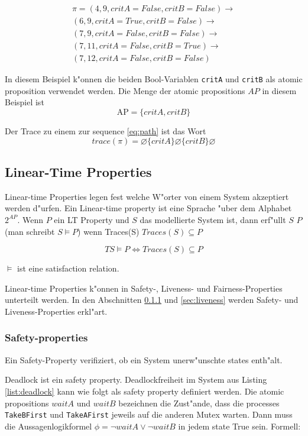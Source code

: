 \documentclass[a4paper, twoside]{article}
\begin{document}
\begin{equation}
  \label{eq:path}
  \begin{split}
\pi = (4, 9, {critA}={False},{critB}=False) \rightarrow \\
(6, 9, {critA}={True},{critB}=False) \rightarrow \\
(7, 9, {critA}={False},{critB}=False) \rightarrow \\
(7, 11, {critA}={False},{critB}=True) \rightarrow \\
(7, 12, {critA}={False},{critB}=False)
  \end{split}
\end{equation}

In diesem Beispiel k"onnen die beiden Bool-Variablen \verb|critA| und \verb|critB| als atomic proposition verwendet werden. Die Menge der atomic propositions $AP$ in diesem Beispiel ist
\[
\text{AP}=\{critA, critB\}
\]

Der Trace zu einem zur sequence \ref{eq:path} ist das Wort
\[
trace(\pi) = \varnothing \{critA\} \varnothing \{critB\} \varnothing
\]

\subsection{Linear-Time Properties}
\label{sec:satisfactionrelations}

Linear-time Properties legen fest welche W"orter von einem System akzeptiert werden d"urfen. Ein Linear-time property ist eine Sprache "uber dem Alphabet $2^{AP}$.
Wenn $P$ ein LT Property und $S$ das modellierte System ist, dann erf"ullt $S$ $P$ (man schreibt $S \models P$) wenn Traces(S) $ Traces(S) \subseteq P $

\[
TS \models P \iff Traces(S) \subseteq P 
\]

$ \models $ ist eine satisfaction relation. 

Linear-time Properties k"onnen in Safety-, Liveness- und Fairness-Properties unterteilt werden. In den Abschnitten \ref{sec:safety} und \ref{sec:liveness} werden Safety- und Liveness-Properties erkl"art.

\subsubsection{Safety-properties}
\label{sec:safety}

Ein Safety-Property verifiziert, ob ein System unerw"unschte states enth"alt. 

Deadlock ist ein safety property. Deadlockfreiheit im System aus Listing \ref{list:deadlock} kann wie folgt als safety property definiert werden. Die atomic propositions $waitA$ und $waitB$ bezeichnen die Zust"ande, dass die processes \verb|TakeBFirst| und \verb|TakeAFirst| jeweils auf die anderen Mutex warten. Dann muss die Aussagenlogikformel  $\phi=\neg waitA \lor \neg waitB$ in jedem state True sein. Formell:
\end{document}
